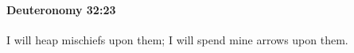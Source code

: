 
		\paragraph{Deuteronomy 32:23} %
			\label{DEUTERONOMY-32-23}

			I will heap mischiefs upon them; I will spend mine arrows upon them.



